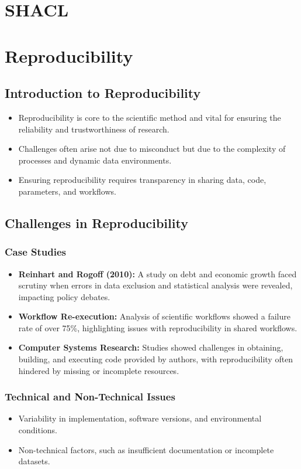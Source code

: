 \section{SHACL}
\section{Reproducibility}

\subsection{Introduction to Reproducibility}
\begin{itemize}
    \item Reproducibility is core to the scientific method and vital for ensuring the reliability and trustworthiness of research.
    \item Challenges often arise not due to misconduct but due to the complexity of processes and dynamic data environments.
    \item Ensuring reproducibility requires transparency in sharing data, code, parameters, and workflows.
\end{itemize}

\subsection{Challenges in Reproducibility}
\subsubsection{Case Studies}
\begin{itemize}
    \item \textbf{Reinhart and Rogoff (2010):} A study on debt and economic growth faced scrutiny when errors in data exclusion and statistical analysis were revealed, impacting policy debates.
    \item \textbf{Workflow Re-execution:} Analysis of scientific workflows showed a failure rate of over 75\%, highlighting issues with reproducibility in shared workflows.
    \item \textbf{Computer Systems Research:} Studies showed challenges in obtaining, building, and executing code provided by authors, with reproducibility often hindered by missing or incomplete resources.
\end{itemize}

\subsubsection{Technical and Non-Technical Issues}
\begin{itemize}
    \item Variability in implementation, software versions, and environmental conditions.
    \item Non-technical factors, such as insufficient documentation or incomplete datasets.
\end{itemize}

